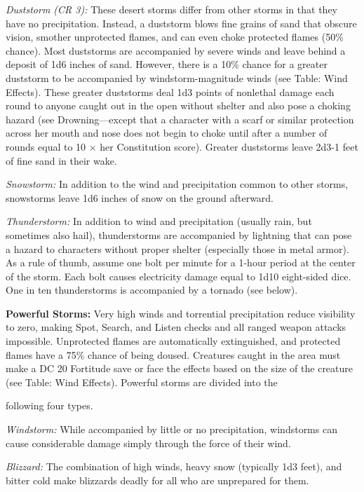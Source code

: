\documentclass{article}
\begin{document}
\textit{Duststorm (CR 3): }These desert storms differ from other storms in that 
they have no precipitation. Instead, a duststorm blows fine grains of sand that 
obscure vision, smother unprotected flames, and can even choke protected flames 
(50\% chance). Most duststorms are accompanied by severe winds and leave behind 
a deposit of 1d6 inches of sand. However, there is a 10\% chance for a greater 
duststorm to be accompanied by windstorm-magnitude winds (see Table: Wind Effects). 
These greater duststorms deal 1d3 points of nonlethal damage each round to anyone 
caught out in the open without shelter and also pose a choking hazard (see Drowning---except 
that a character with a scarf or similar protection across her mouth and nose does 
not begin to choke until after a number of rounds equal to 10 \ensuremath{\times} 
her Constitution score). Greater duststorms leave 2d3-1 feet of fine sand in their 
wake.

\textit{Snowstorm: }In addition to the wind and precipitation common to other storms, 
snowstorms leave 1d6 inches of snow on the ground afterward. 

\textit{Thunderstorm: }In addition to wind and precipitation (usually rain, but 
sometimes also hail), thunderstorms are accompanied by lightning that can pose 
a hazard to characters without proper shelter (especially those in metal armor). 
As a rule of thumb, assume one bolt per minute for a 1-hour period at the center 
of the storm. Each bolt causes electricity damage equal to 1d10 eight-sided dice. 
One in ten thunderstorms is accompanied by a tornado (see below). 

\textbf{Powerful Storms:} Very high winds and torrential precipitation reduce visibility 
to zero, making Spot, Search, and Listen checks and all ranged weapon attacks impossible. 
Unprotected flames are automatically extinguished, and protected flames have a 
75\% chance of being doused. Creatures caught in the area must make a DC 20 Fortitude 
save or face the effects based on the size of the creature (see Table: Wind Effects). 
Powerful storms are divided into the

following four types.

\textit{Windstorm: }While accompanied by little or no precipitation, windstorms 
can cause considerable damage simply through the force of their wind.

\textit{Blizzard: }The combination of high winds, heavy snow (typically 1d3 feet), 
and bitter cold make blizzards deadly for all who are unprepared for them.
\end{document}
